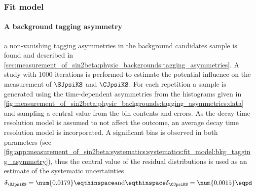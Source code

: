 \subsubsection{Fit model}
\label{sec:measurement_of_sin2beta:systematics:systematics:fit_model}

\paragraph{A background tagging asymmetry} \ie a non-vanishing tagging
asymmetries in the background candidates sample is found and described in
\cref{sec:measurement_of_sin2beta:physic_backgrounds:tagging_asymmetries}. A
\ToyMC study with $\num{1000}$ iterations is performed to estimate the potential
influence on the measurement of $\SJpsiKS$ and $\CJpsiKS$. For each repetition a
sample is generated using the time-dependent asymmetries from the histograms
given in
\cref{fig:measurement_of_sin2beta:physic_backgrounds:tagging_asymmetries:data}
and sampling a central value from the bin contents and errors. As the decay time
resolution model is assumed to not affect the outcome, an average decay time
resolution model is incorporated. A significant bias is observed in both \CP
parameters (see \cref{fig:app:measurement_of_sin2beta:systematics:systematics:fit_model:bkg_tagging_asymmetry}),
thus the central value of the residual distributions is used as an estimate of
the systematic uncertainties
%
\begin{equation}
  \delta_{\SJpsiKS} = \num{0.0179}\eqthinspace\text{and}\eqthinspace\delta_{\CJpsiKS} = \num{0.0015}\eqpd
\end{equation}

